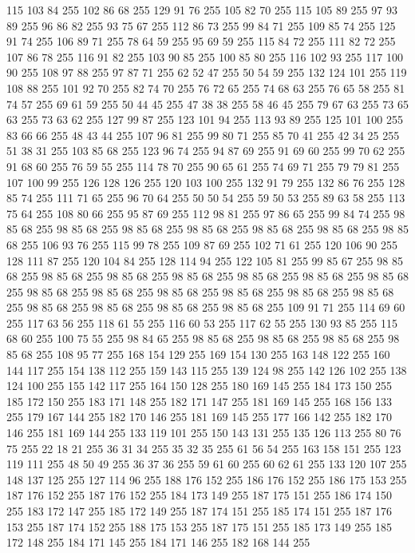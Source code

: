 115 103 84 255 102 86 68 255 129 91 76 255 105 82 70 255 115 105 89 255 97 93 89 255 96 86 82 255 93 75 67 255 112 86 73 255 99 84 71 255 109 85 74 255 125 91 74 255 106 89 71 255 78 64 59 255 95 69 59 255 115 84 72 255 111 82 72 255 107 86 78 255 116 91 82 255 103 90 85 255 100 85 80 255 116 102 93 255 117 100 90 255 108 97 88 255 97 87 71 255 62 52 47 255 50 54 59 255 132 124 101 255 119 108 88 255 101 92 70 255 82 74 70 255 76 72 65 255 74 68 63 255 76 65 58 255 81 74 57 255 69 61 59 255 50 44 45 255 47 38 38 255 58 46 45 255 79 67 63 255 73 65 63 255 73 63 62 255 127 99 87 255 123 101 94 255 113 93 89 255 125 101 100 255 83 66 66 255 48 43 44 255 107 96 81 255 99 80 71 255 85 70 41 255 42 34 25 255 51 38 31 255 103 85 68 255 123 96 74 255 94 87 69 255 91 69 60 255 99 70 62 255 91 68 60 255 76 59 55 255 114 78 70 255 90 65 61 255 74 69 71 255 79 79 81 255
107 100 99 255 126 128 126 255 120 103 100 255 132 91 79 255 132 86 76 255 128 85 74 255 111 71 65 255 96 70 64 255 50 50 54 255 59 50 53 255 89 63 58 255 113 75 64 255 108 80 66 255 95 87 69 255 112 98 81 255 97 86 65 255 99 84 74 255 98 85 68 255 98 85 68 255 98 85 68 255 98 85 68 255 98 85 68 255 98 85 68 255 98 85 68 255 106 93 76 255 115 99 78 255 109 87 69 255 102 71 61 255 120 106 90 255 128 111 87 255 120 104 84 255 128 114 94 255 122 105 81 255 99 85 67 255 98 85 68 255 98 85 68 255 98 85 68 255 98 85 68 255 98 85 68 255 98 85 68 255 98 85 68 255 98 85 68 255 98 85 68 255 98 85 68 255 98 85 68 255 98 85 68 255 98 85 68 255 98 85 68 255 98 85 68 255 98 85 68 255 98 85 68 255 109 91 71 255 114 69 60 255 117 63 56 255 118 61 55 255 116 60 53 255 117 62 55 255 130 93 85 255 115 68 60 255 100 75 55 255 98 84 65 255 98 85 68 255 98 85 68 255 98 85 68 255
98 85 68 255 108 95 77 255 168 154 129 255 169 154 130 255 163 148 122 255 160 144 117 255 154 138 112 255 159 143 115 255 139 124 98 255 142 126 102 255 138 124 100 255 155 142 117 255 164 150 128 255 180 169 145 255 184 173 150 255 185 172 150 255 183 171 148 255 182 171 147 255 181 169 145 255 168 156 133 255 179 167 144 255 182 170 146 255 181 169 145 255 177 166 142 255 182 170 146 255 181 169 144 255 133 119 101 255 150 143 131 255 135 126 113 255 80 76 75 255 22 18 21 255 36 31 34 255 35 32 35 255 61 56 54 255 163 158 151 255 123 119 111 255 48 50 49 255 36 37 36 255 59 61 60 255 60 62 61 255 133 120 107 255 148 137 125 255 127 114 96 255 188 176 152 255 186 176 152 255 186 175 153 255 187 176 152 255 187 176 152 255 184 173 149 255 187 175 151 255 186 174 150 255 183 172 147 255 185 172 149 255 187 174 151 255 185 174 151 255 187 176 153 255 187 174 152 255 188 175 153 255 187 175 151 255 185 173 149 255 185 172 148 255 184 171 145 255 184 171 146 255 182 168 144 255

